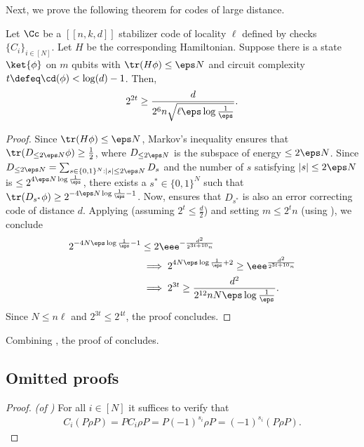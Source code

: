 \documentclass{toc}
\begin{document}
Next, we prove the following theorem for codes of large distance.
\begin{theorem}
\label{thm:distance_clb}
Let $\Cc$ be a $[[n,k,d]]$ stabilizer code of locality $\ell$ defined by checks $\{C_i\}_{i \in [N]}$. Let $H$ be the corresponding Hamiltonian. Suppose there is a state $\ket{\phi}$ on $m$ qubits with $\tr(H\phi) \leq \eps N$ and circuit complexity $t \defeq \cd(\phi) < \log(d) - 1$. Then, 
\begin{align}
2^{2t} \geq \frac{d}{2^{6}n\sqrt{\ell\eps \log\frac{1}{\eps}}}.
\end{align}

\end{theorem}
\begin{proof}
Since $\tr(H\phi) \leq \eps N$, Markov's inequality ensures that $\tr(D_{\leq 2\eps N}\phi) \geq \frac{1}{2}$, where $D_{\leq 2\eps N}$ is the subspace of energy $\leq 2\eps N$. Since $D_{\leq 2\eps N} = \sum_{s\in \{0,1\}^N: |s|\leq 2\eps N} D_s$ and the number of $s$ satisfying $|s|\leq 2\eps N$ is $\leq 2^{4\eps N \log \frac{1}{\eps}}$, there exists a $s^*\in \{0,1\}^N$ such that $\tr(D_{s^*}\phi) \geq 2^{-4\eps N \log \frac{1}{\eps}-1}$. Now,  ensures that $D_{s^*}$ is also an error correcting code of distance $d$. Applying  (assuming $2^t\leq \frac{d}{2}$) and setting $m\leq 2^t n$ (using ), we conclude
\begin{align}
2^{-4N \eps \log \frac{1}{\eps}-1} &\leq  2\eee^{-\frac{d^2}{2^{3t+10}n}} \\
&\implies 2^{4N \eps \log \frac{1}{\eps}+2} \geq  \eee^{\frac{d^2}{2^{3t+10}n}} \\
&\implies 2^{3t}\geq \frac{d^2}{2^{12}nN\eps \log\frac{1}{\eps}}.
\end{align}
Since $N\leq n\ell$ and $2^{3t}\leq 2^{4t}$, the proof concludes.
\end{proof}
Combining  , the proof of  concludes.
%
%
%
%
%
%
%
%

\subsection{Omitted proofs}

\begin{proof}\textit{(of )}
For all $i \in [N]$ it suffices to verify that
\begin{align}
C_i (P \rho P) = P C_i \rho P = P (-1)^{s_i} \rho P = (-1)^{s_i} (P \rho P).
\end{align}
\end{proof}
\end{document}

